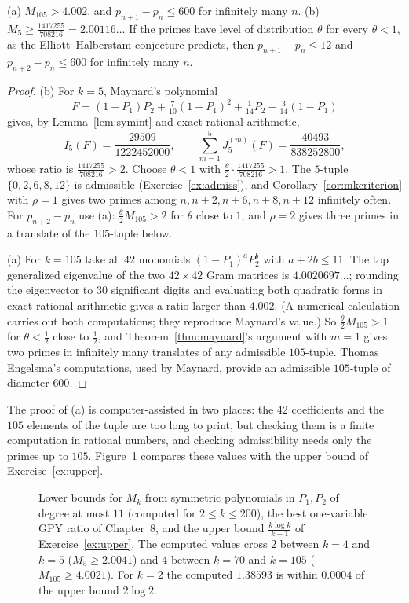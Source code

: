 \begin{theorem}[Maynard, 2013]\label{thm:six}
(a) $M_{105}>4.002$, and $p_{n+1}-p_n\le600$ for infinitely many $n$.
(b) $M_5\ge\frac{1417255}{708216}=2.00116\ldots$ If the primes have level of distribution $\theta$ for every $\theta<1$, as the Elliott--Halberstam conjecture predicts, then $p_{n+1}-p_n\le12$ and $p_{n+2}-p_n\le600$ for infinitely many $n$.
\end{theorem}
\begin{proof}
(b) For $k=5$, Maynard's polynomial
\[
F=(1-P_1)P_2+\tfrac7{10}(1-P_1)^2+\tfrac1{14}P_2-\tfrac3{14}(1-P_1)
\]
gives, by Lemma~\ref{lem:symint} and exact rational arithmetic,
\[
I_5(F)=\frac{29509}{1222452000},\qquad\sum_{m=1}^5J_5^{(m)}(F)=\frac{40493}{838252800},
\]
whose ratio is $\frac{1417255}{708216}>2$. Choose $\theta<1$ with $\frac\theta2\cdot\frac{1417255}{708216}>1$. The $5$-tuple $\{0,2,6,8,12\}$ is admissible (Exercise~\ref{ex:admiss}), and Corollary~\ref{cor:mkcriterion} with $\rho=1$ gives two primes among $n,n+2,n+6,n+8,n+12$ infinitely often. For $p_{n+2}-p_n$ use (a): $\frac\theta2M_{105}>2$ for $\theta$ close to $1$, and $\rho=2$ gives three primes in a translate of the $105$-tuple below.

(a) For $k=105$ take all $42$ monomials $(1-P_1)^aP_2^b$ with $a+2b\le11$. The top generalized eigenvalue of the two $42\times42$ Gram matrices is $4.0020697\ldots$; rounding the eigenvector to $30$ significant digits and evaluating both quadratic forms in exact rational arithmetic gives a ratio larger than $4.002$. (A numerical calculation carries out both computations; they reproduce Maynard's value.) So $\frac\theta2M_{105}>1$ for $\theta<\frac12$ close to $\frac12$, and Theorem~\ref{thm:maynard}'s argument with $m=1$ gives two primes in infinitely many translates of any admissible $105$-tuple. Thomas Engelsma's computations, used by Maynard, provide an admissible $105$-tuple of diameter $600$.
\end{proof}

The proof of (a) is computer-assisted in two places: the $42$ coefficients and the $105$ elements of the tuple are too long to print, but checking them is a finite computation in rational numbers, and checking admissibility needs only the primes up to $105$. Figure~\ref{fig:mk} compares these values with the upper bound of Exercise~\ref{ex:upper}.

\begin{figure}[ht]
\centering
{}
\caption{Lower bounds for $M_k$ from symmetric polynomials in $P_1,P_2$ of degree at most $11$ (computed for $2\le k\le200$), the best one-variable GPY ratio of Chapter~8, and the upper bound $\frac{k\log k}{k-1}$ of Exercise~\ref{ex:upper}. The computed values cross $2$ between $k=4$ and $k=5$ ($M_5\ge2.0041$) and $4$ between $k=70$ and $k=105$ ($M_{105}\ge4.0021$). For $k=2$ the computed $1.38593$ is within $0.0004$ of the upper bound $2\log2$.}
\label{fig:mk}
\end{figure}

